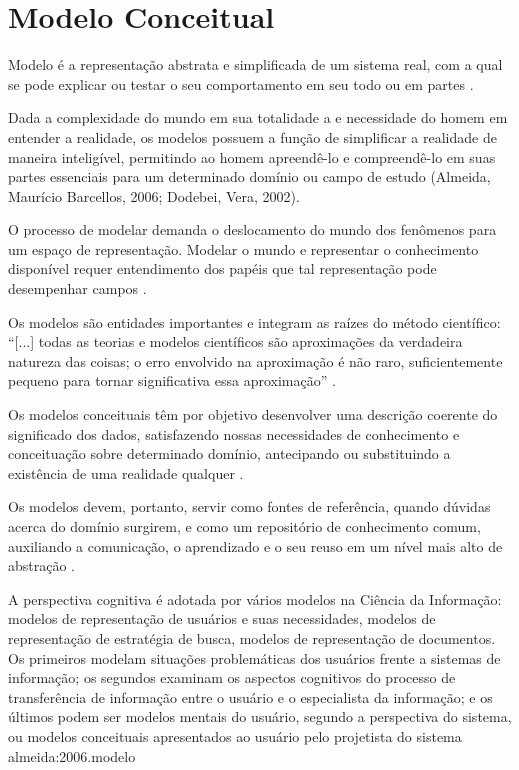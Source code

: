 \chapter{\hspace*{3pt} Modelo Conceitual}
\label{chap:modeloConceitual}

Modelo é a representação abstrata e simplificada de um sistema real, com a qual se pode explicar ou testar o seu comportamento em seu todo ou em partes \cite{cougo:1997.modelagem,castro:2010.abordagem}.

Dada a complexidade do mundo em sua totalidade a e necessidade do homem em entender a realidade, os modelos possuem a função de simplificar a realidade de maneira inteligível, permitindo ao homem apreendê-lo e compreendê-lo em suas partes essenciais para um determinado domínio ou campo de estudo (Almeida, Maurício Barcellos, 2006; Dodebei, Vera, 2002).

O processo de modelar demanda o deslocamento do mundo dos fenômenos para um espaço de representação. Modelar o mundo e representar o conhecimento disponível requer entendimento dos papéis que tal representação pode desempenhar campos \cite{campos:2004.modelizacao}.

Os modelos são entidades importantes e integram as raízes do método científico: “[...] todas as teorias e modelos científicos são aproximações da verdadeira natureza das coisas; o erro envolvido na aproximação é não raro, suficientemente pequeno para tornar significativa essa aproximação” .

Os modelos conceituais têm por objetivo desenvolver uma descrição coerente do significado dos dados, satisfazendo nossas necessidades de conhecimento e conceituação sobre determinado domínio, antecipando ou substituindo a existência de uma realidade qualquer \cite{higuchi:2012.representaccao}.

Os modelos devem, portanto, servir como fontes de referência, quando dúvidas acerca do domínio surgirem, e como um repositório de conhecimento comum, auxiliando a comunicação, o aprendizado e o seu reuso em um nível mais alto de abstração .

A perspectiva cognitiva é adotada por vários modelos na Ciência da Informação: modelos de representação de usuários e suas necessidades, modelos de representação de estratégia de busca, modelos de representação de documentos. Os primeiros modelam situações problemáticas dos usuários frente a sistemas de informação; os segundos examinam os aspectos cognitivos do processo de transferência de informação entre o usuário e o especialista da informação; e os últimos podem ser modelos mentais do usuário, segundo a perspectiva do sistema, ou modelos conceituais apresentados ao usuário pelo projetista do sistema \cite{sayao:2001.modelos}{almeida:2006.modelo}

